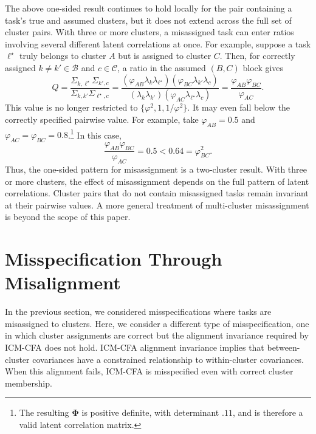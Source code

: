 \documentclass[
  american,
  man,floatsintext]{apa7}
\begin{document}
The above one-sided result continues to hold locally for the pair containing a task's true and assumed clusters, but it does not extend across the full set of cluster pairs. With three or more clusters, a misassigned task can enter ratios involving several different latent correlations at once. For example, suppose a task \(\ell^\star\) truly belongs to cluster \(A\) but is assigned to cluster \(C\). Then, for correctly assigned \(k\neq k'\in\mathcal B\) and \(c\in\mathcal C\), a ratio in the assumed \((B,C)\) block gives
\[
Q
=
\frac{\Sigma_{k,\ell^\star}\Sigma_{k',c}}
{\Sigma_{k,k'}\Sigma_{\ell^\star,c}}
=
\frac{
(\varphi_{AB}\lambda_k\lambda_{\ell^\star})
(\varphi_{BC}\lambda_{k'}\lambda_c)
}{
(\lambda_k\lambda_{k'})
(\varphi_{AC}\lambda_{\ell^\star}\lambda_c)
}
=
\frac{\varphi_{AB}\varphi_{BC}}{\varphi_{AC}}.
\]
This value is no longer restricted to \(\{\varphi^2,1,1/\varphi^2\}\). It may even fall below the correctly specified pairwise value. For example, take \(\varphi_{AB}=0.5\) and \(\varphi_{AC}=\varphi_{BC}=0.8\).\footnote{The resulting \(\pmb{\Phi}\) is positive definite, with determinant \(.11\), and is therefore a valid latent correlation matrix.} In this case,
\[
\frac{\varphi_{AB}\varphi_{BC}}{\varphi_{AC}}
=
0.5
<
0.64
=
\varphi_{BC}^2.
\]
Thus, the one-sided pattern for misassignment is a two-cluster result. With three or more clusters, the effect of misassignment depends on the full pattern of latent correlations. Cluster pairs that do not contain misassigned tasks remain invariant at their pairwise values. A more general treatment of multi-cluster misassignment is beyond the scope of this paper.

\section{Misspecification Through Misalignment}\label{misspecification-through-misalignment}

In the previous section, we considered misspecifications where tasks are misassigned to clusters. Here, we consider a different type of misspecification, one in which cluster assignments are correct but the alignment invariance required by ICM-CFA does not hold. ICM-CFA alignment invariance implies that between-cluster covariances have a constrained relationship to within-cluster covariances. When this alignment fails, ICM-CFA is misspecified even with correct cluster membership.
\end{document}
